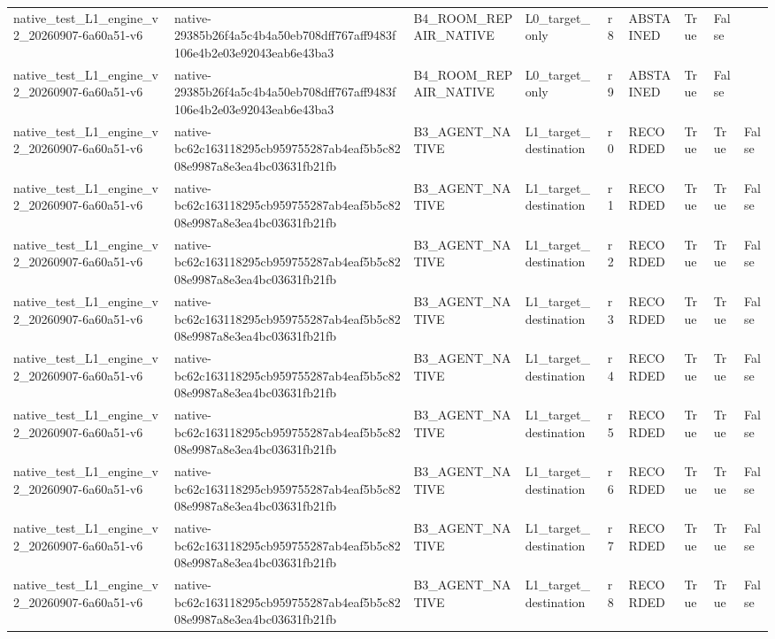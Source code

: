 \begin{tabular}{lllllllll}
native\_test\_L1\_engine\_v2\_20260907-6a60a51-v6 & native-29385b26f4a5c4b4a50eb708dff767aff9483f106e4b2e03e92043eab6e43ba3 & B4\_ROOM\_REPAIR\_NATIVE & L0\_target\_only & r8 & ABSTAINED & True & False &  \\
native\_test\_L1\_engine\_v2\_20260907-6a60a51-v6 & native-29385b26f4a5c4b4a50eb708dff767aff9483f106e4b2e03e92043eab6e43ba3 & B4\_ROOM\_REPAIR\_NATIVE & L0\_target\_only & r9 & ABSTAINED & True & False &  \\
native\_test\_L1\_engine\_v2\_20260907-6a60a51-v6 & native-bc62c163118295cb959755287ab4eaf5b5c8208e9987a8e3ea4bc03631fb21fb & B3\_AGENT\_NATIVE & L1\_target\_destination & r0 & RECORDED & True & True & False \\
native\_test\_L1\_engine\_v2\_20260907-6a60a51-v6 & native-bc62c163118295cb959755287ab4eaf5b5c8208e9987a8e3ea4bc03631fb21fb & B3\_AGENT\_NATIVE & L1\_target\_destination & r1 & RECORDED & True & True & False \\
native\_test\_L1\_engine\_v2\_20260907-6a60a51-v6 & native-bc62c163118295cb959755287ab4eaf5b5c8208e9987a8e3ea4bc03631fb21fb & B3\_AGENT\_NATIVE & L1\_target\_destination & r2 & RECORDED & True & True & False \\
native\_test\_L1\_engine\_v2\_20260907-6a60a51-v6 & native-bc62c163118295cb959755287ab4eaf5b5c8208e9987a8e3ea4bc03631fb21fb & B3\_AGENT\_NATIVE & L1\_target\_destination & r3 & RECORDED & True & True & False \\
native\_test\_L1\_engine\_v2\_20260907-6a60a51-v6 & native-bc62c163118295cb959755287ab4eaf5b5c8208e9987a8e3ea4bc03631fb21fb & B3\_AGENT\_NATIVE & L1\_target\_destination & r4 & RECORDED & True & True & False \\
native\_test\_L1\_engine\_v2\_20260907-6a60a51-v6 & native-bc62c163118295cb959755287ab4eaf5b5c8208e9987a8e3ea4bc03631fb21fb & B3\_AGENT\_NATIVE & L1\_target\_destination & r5 & RECORDED & True & True & False \\
native\_test\_L1\_engine\_v2\_20260907-6a60a51-v6 & native-bc62c163118295cb959755287ab4eaf5b5c8208e9987a8e3ea4bc03631fb21fb & B3\_AGENT\_NATIVE & L1\_target\_destination & r6 & RECORDED & True & True & False \\
native\_test\_L1\_engine\_v2\_20260907-6a60a51-v6 & native-bc62c163118295cb959755287ab4eaf5b5c8208e9987a8e3ea4bc03631fb21fb & B3\_AGENT\_NATIVE & L1\_target\_destination & r7 & RECORDED & True & True & False \\
native\_test\_L1\_engine\_v2\_20260907-6a60a51-v6 & native-bc62c163118295cb959755287ab4eaf5b5c8208e9987a8e3ea4bc03631fb21fb & B3\_AGENT\_NATIVE & L1\_target\_destination & r8 & RECORDED & True & True & False \\

\end{tabular}
